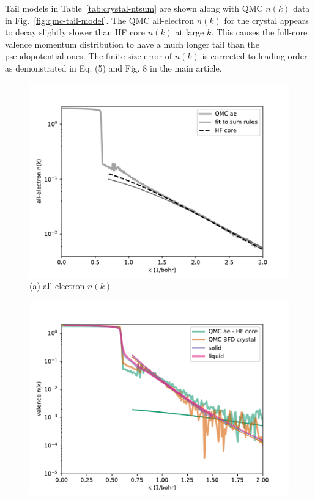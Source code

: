\documentclass[aps,prl,superscriptaddress]{revtex4-1}
\begin{document}
Tail models in Table~\ref{tab:crystal-ntsum} are shown along with QMC $n(k)$ data in Fig.~\ref{fig:qmc-tail-model}. The QMC all-electron $n(k)$ for the crystal appears to decay slightly slower than HF core $n(k)$ at large $k$. This causes the full-core valence momentum distribution to have a much longer tail than the pseudopotential ones. 
The finite-size error of $n(k)$ is corrected to leading order as demonstrated in Eq. (5) and Fig. 8 in the main article.

\begin{figure}[h]
\begin{minipage}{0.49\linewidth}
\includegraphics[width=\columnwidth]{li62e_ae-hf-tail}
(a) all-electron $n(k)$
\end{minipage}
\begin{minipage}{0.49\linewidth}
\includegraphics[width=\columnwidth]{li62e_valence-tail}

\end{minipage}
\end{figure}
\end{document}
